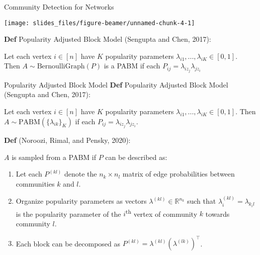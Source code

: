 \documentclass[
  ignorenonframetext,
]{beamer}
\providecommand{\tightlist}{%
  \setlength{\itemsep}{0pt}\setlength{\parskip}{0pt}}
\begin{document}
\begin{frame}{Community Detection for Networks}
\protect\hypertarget{community-detection-for-networks}{}
\newcommand{\diag}{\text{diag}}
\newcommand{\tr}{\text{Tr}}
\newcommand{\blockdiag}{\text{blockdiag}}
\newcommand{\indep}{\stackrel{\text{ind}}{\sim}}
\newcommand{\iid}{\stackrel{\text{iid}}{\sim}}
\newcommand{\Bernoulli}{\text{Bernoulli}}
\newcommand{\Betadist}{\text{Beta}}
\newcommand{\BG}{\text{BernoulliGraph}}
\newcommand{\Cat}{\text{Categorical}}
\newcommand{\Uniform}{\text{Uniform}}
\newcommand{\RDPG}{\text{RDPG}}
\newcommand{\GRDPG}{\text{GRDPG}}
\newcommand{\PABM}{\text{PABM}}

\begin{center}\texttt{[image: slides\_files/figure-beamer/unnamed-chunk-4-1]} \end{center}

\textbf{Def} Popularity Adjusted Block Model (Sengupta and Chen, 2017):

Let each vertex \(i \in [n]\) have \(K\) popularity parameters
\(\lambda_{i1}, ..., \lambda_{iK} \in [0, 1]\).\\
Then \(A \sim \text{BernoulliGraph}(P)\) is a PABM if each
\(P_{ij} = \lambda_{i z_j} \lambda_{j z_i}\)
\end{frame}

\begin{frame}{Popularity Adjusted Block Model}
\protect\hypertarget{popularity-adjusted-block-model}{}
\textbf{Def} Popularity Adjusted Block Model (Sengupta and Chen, 2017):

Let each vertex \(i \in [n]\) have \(K\) popularity parameters
\(\lambda_{i1}, ..., \lambda_{iK} \in [0, 1]\). Then
\(A \sim \text{PABM}(\{\lambda_{ik}\}_K)\) if each
\(P_{ij} = \lambda_{i z_j} \lambda_{j z_i}\).

\textbf{Def} (Noroozi, Rimal, and Pensky, 2020):

\(A\) is sampled from a PABM if \(P\) can be described as:

\begin{enumerate}
\tightlist
\item
  Let each \(P^{(kl)}\) denote the \(n_k \times n_l\) matrix of edge
  probabilities between communities \(k\) and \(l\).
\item
  Organize popularity parameters as vectors
  \(\lambda^{(kl)} \in \mathbb{R}^{n_k}\) such that
  \(\lambda^{(kl)}_i = \lambda_{k_i l}\) is the popularity parameter of
  the \(i\)\textsuperscript{th} vertex of community \(k\) towards
  community \(l\).
\item
  Each block can be decomposed as
  \(P^{(kl)} = \lambda^{(kl)} (\lambda^{(lk)})^\top\).
\end{enumerate}
\end{frame}
\end{document}
